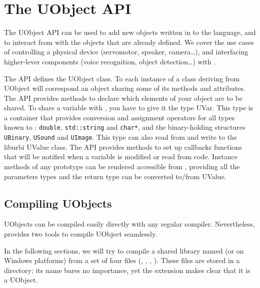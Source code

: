 
\chapter{The UObject API}
\label{sec:uob:api}

The UObject API can be used to add new objects written in \Cxx to the
\us language, and to interact from \Cxx with the objects that are
already defined. We cover the use cases of controlling a physical
device (servomotor, speaker, camera\ldots), and interfacing
higher-lever components (voice recognition, object detection\ldots)
with \urbi.

The \Cxx API defines the UObject class. To each instance of a \Cxx class
deriving from UObject
will correspond an \us object sharing some of its
methods and attributes. The API provides methods to declare which
elements of your object are to be shared. To share a variable with
\urbi, you have to give it the type UVar. This type is a container
that provides conversion and assignment operators for all types known to
\urbi: \lstinline{double}, \lstinline{std::string} and \lstinline{char*},
and the binary-holding structures
\lstinline{UBinary}, \lstinline{USound} and \lstinline{UImage}. This type
can also read from and write to
the liburbi UValue class. The API provides methods to set up callbacks
functions that will be notified when a variable is modified or read
from \urbi code. Instance methods of any prototype can be rendered
accessible from \us, providing all the parameters types and the return
type can be converted to/from UValue.

\section{Compiling UObjects}

UObjects can be compiled easily directly with any regular compiler.
Nevertheless, \usdk provides two tools to compile UObject seamlessly.

In the following sections, we will try to compile a shared library named
 (or  on Windows platforms) from a set of
four files (, , ,
).  These files are stored in a 
directory; its name bares no importance, yet the  extension
makes clear that it is a UObject.

